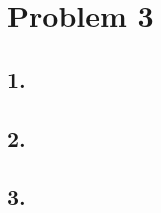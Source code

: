 \documentclass[
]{article}
\begin{document}
\hypertarget{problem-3}{%
\section{Problem 3}\label{problem-3}}

\hypertarget{section-10}{%
\subsection{1.}\label{section-10}}

\hypertarget{section-11}{%
\subsection{2.}\label{section-11}}

\hypertarget{section-12}{%
\subsection{3.}\label{section-12}}
\end{document}
